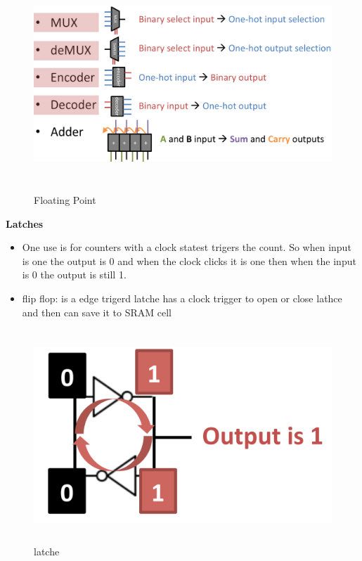 \begin{figure}[h]
    \vspace{10mm}
    \centering
    \includegraphics[width=16cm, height=8cm]{image/important-logic-blocks.png} 
    \caption{Floating Point}
\end{figure}

\textbf{Latches}
\begin{itemize}
\item  One use is for counters with a clock statest trigers the count.
  So when input is one the output is 0 and when the clock clicks it is one then when the input is
  0 the output is still 1.
\item flip flop: is a edge trigerd latche has a clock trigger to open or close lathce and then can save it to SRAM cell
\end{itemize}

\begin{figure}[h]
    \vspace{10mm}
    \centering
    \includegraphics[width=16cm, height=8cm]{image/latche.png} 
    \caption{latche}
\end{figure}

